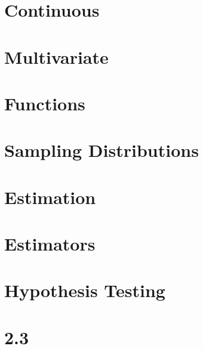 \documentclass[12pt]{article}
\begin{document}
\section{Continuous}
\section{Multivariate}
\section{Functions}
\section{Sampling Distributions}
\section{Estimation}
\section{Estimators}
\section{Hypothesis Testing}





	



\section{2.3}
	\subsection{}
\end{document}
